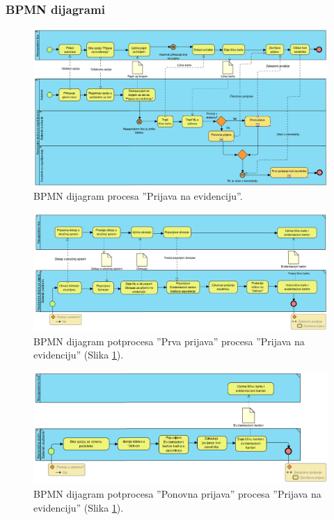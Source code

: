 \begin{mylandscape}
	\subsubsection{BPMN dijagrami}
	
	\begin{figure}[H]
		\centering
		\includegraphics[width=0.6\paperwidth]{dijagrami/bpmn-dijagrami/prijava-na-evidenciju.png}
		\caption{BPMN dijagram procesa ''Prijava na evidenciju''.}
		\label{bpmnd: prijava na evidenciju}
	\end{figure}
	
	\newpage
	
	\begin{figure}[H]
		\centering
		\includegraphics[width=0.8\paperwidth]{dijagrami/bpmn-dijagrami/prva-prijava.png}
		\caption{BPMN dijagram potprocesa ''Prva prijava'' procesa ''Prijava na evidenciju'' (Slika \ref{bpmnd: prijava na evidenciju}).}
	\end{figure}
	
	\newpage
	
	\begin{figure}[H]
		\centering
		\includegraphics[width=0.8\paperwidth]{dijagrami/bpmn-dijagrami/ponovna-prijava.png}
		\caption{BPMN dijagram potprocesa ''Ponovna prijava'' procesa ''Prijava na evidenciju''  (Slika \ref{bpmnd: prijava na evidenciju}).}
	\end{figure}
	

\end{mylandscape}
